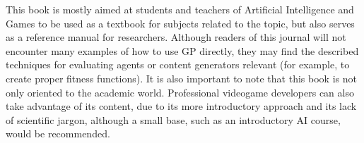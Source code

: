 \documentclass{article}
\begin{document}
This book is mostly aimed at students and teachers of Artificial Intelligence and Games to be used as a textbook for subjects related to the topic, but also serves as a reference manual for researchers.  Although readers of this journal will not encounter many examples of how to use GP directly, they may find the described techniques for evaluating agents or content generators relevant (for example, to create proper fitness functions). It is also important to note that this book is not only oriented to the academic world. Professional videogame developers can also take advantage of its content, due to its more introductory approach and its lack of scientific jargon, although a small base, such as an introductory AI course, would be recommended.



\end{document}
